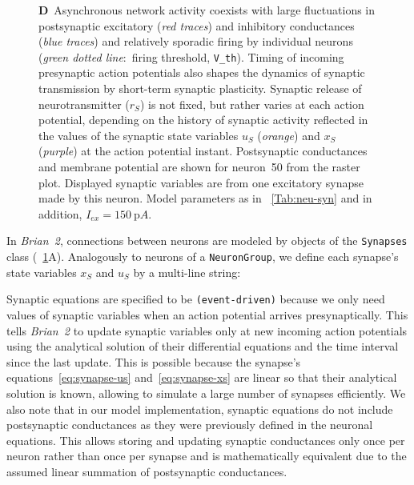 \documentclass[a4paper, 11pt]{article}
\newcommand{\brian}{\emph{Brian~2}\xspace}
\newcommand*{\tabref}[1]{\tablename~\ref{#1}}
\newcommand*{\figref}[1]{\figurename~\ref{#1}}
\begin{document}
\begin{figure}[!p]
{%
\textbf{D}~Asynchronous network activity coexists with large fluctuations in postsynaptic excitatory (\textit{red traces}) and inhibitory conductances (\textit{blue traces}) and relatively sporadic firing by individual neurons (\textit{green dotted line}:~firing threshold, \lstinline|V_th|).
Timing of incoming presynaptic action potentials also shapes the dynamics of synaptic transmission by short-term synaptic plasticity.
Synaptic release of neurotransmitter ($r_S$) is not fixed, but rather varies at each action potential, depending on the history of synaptic activity reflected in the values of the synaptic state variables $u_S$ (\textit{orange}) and $x_S$ (\textit{purple}) at the action potential instant.
Postsynaptic conductances and membrane potential are shown for neuron~50 from the raster plot. Displayed synaptic variables are from one excitatory synapse made by this neuron. Model parameters as in \tabref{Tab:neu-syn} and in addition, $I_{ex} = \SI{150}{\pico A}$.}
\label{Fig:COBA}
\end{figure}

In \brian, connections between neurons are modeled by objects of the \lstinline|Synapses| class (\figref{Fig:COBA}A). Analogously to neurons of a \lstinline|NeuronGroup|, we define each synapse's state variables $x_S$ and $u_S$ by a multi-line string:

Synaptic equations are specified to be \lstinline|(event-driven)| because we only need values of synaptic variables when an action potential arrives presynaptically.
This tells \brian to update synaptic variables only at new incoming action potentials using the analytical solution of their differential equations and the time interval since the last update.
This is possible because the synapse's equations~\ref{eq:synapse-us} and~\ref{eq:synapse-xs} are linear so that their analytical solution is known, allowing to simulate a large number of synapses efficiently.
We also note that in our model implementation, synaptic equations do not include postsynaptic conductances as they were previously defined in the neuronal equations.
This allows storing and updating synaptic conductances only once per neuron rather than once per synapse and is mathematically equivalent due to the assumed linear summation of postsynaptic conductances.
\end{document}
